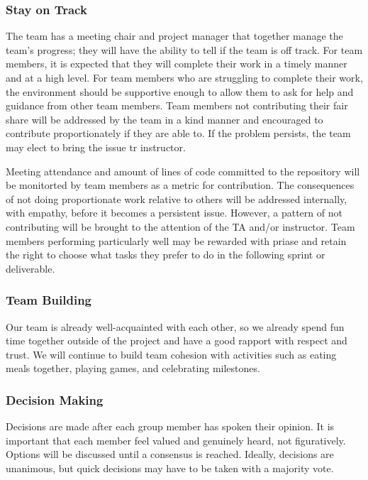 \documentclass{article}
\begin{document}
\subsubsection*{Stay on Track}

The team has a meeting chair and project manager that together manage the team's progress; they will have the ability to tell if the team is off track. For team members, it is expected that they will complete their work in a timely manner and at a high level. For team members who are struggling to complete their work, the environment should be supportive enough to allow them to ask for help and guidance from other team members. Team members not contributing their fair share will be addressed by the team in a kind manner and encouraged to contribute proportionately if they are able to. If the problem persists, the team may elect to bring the issue tr instructor.

Meeting attendance and amount of lines of code committed to the repository will be monitorted by team members as a metric for contribution. The consequences of not doing proportionate work relative to others will be addressed internally, with empathy, before it becomes a persistent issue. However, a pattern of not contributing will be brought to the attention of the TA and/or instructor. Team members performing particularly well may be rewarded with priase and retain the right to choose what tasks they prefer to do in the following sprint or deliverable.


\subsubsection*{Team Building}

Our team is already well-acquainted with each other, so we already spend fun time together outside of the project and have a good rapport with respect and trust. We will continue to build team cohesion with activities such as eating meals together, playing games, and celebrating milestones. 

\subsubsection*{Decision Making} 

Decisions are made after each group member has spoken their opinion. It is important that each member feel valued and genuinely heard, not figuratively. Options will be discussed until a consensus is reached. Ideally, decisions are unanimous, but quick decisions may have to be taken with a majority vote.
\end{document}
